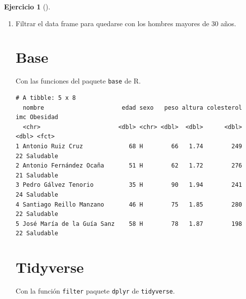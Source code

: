 \documentclass[
  a4paper,
]{scrreport}
\newenvironment{Shaded}{\begin{snugshade}}{\end{snugshade}}
\newcommand{\DecValTok}[1]{\textcolor[rgb]{0.68,0.00,0.00}{#1}}
\newcommand{\NormalTok}[1]{\textcolor[rgb]{0.00,0.23,0.31}{#1}}
\newcommand{\SpecialCharTok}[1]{\textcolor[rgb]{0.37,0.37,0.37}{#1}}
\newcommand{\StringTok}[1]{\textcolor[rgb]{0.13,0.47,0.30}{#1}}
\theoremstyle{definition}
\newtheorem{exercise}{Ejercicio}[chapter]
\theoremstyle{remark}
\begin{document}
\begin{exercise}[]
\begin{enumerate}
\begin{tcolorbox}
  \end{tcolorbox}
\item
  Filtrar el data frame para quedarse con los hombres mayores de 30
  años.

  \begin{tcolorbox}[enhanced jigsaw, breakable, toptitle=1mm, colbacktitle=quarto-callout-tip-color!10!white, rightrule=.15mm, opacityback=0, opacitybacktitle=0.6, titlerule=0mm, coltitle=black, colframe=quarto-callout-tip-color-frame, colback=white, bottomtitle=1mm, leftrule=.75mm, toprule=.15mm, title=\textcolor{quarto-callout-tip-color}{\faLightbulb}\hspace{0.5em}{Solución}, arc=.35mm, bottomrule=.15mm, left=2mm]

  \section{Base}

  Con las funciones del paquete \texttt{base} de R.

\begin{Shaded}
\end{Shaded}

\begin{verbatim}
# A tibble: 5 x 8
  nombre                      edad sexo   peso altura colesterol   imc Obesidad 
  <chr>                      <dbl> <chr> <dbl>  <dbl>      <dbl> <dbl> <fct>    
1 Antonio Ruiz Cruz             68 H        66   1.74        249    22 Saludable
2 Antonio Fernández Ocaña       51 H        62   1.72        276    21 Saludable
3 Pedro Gálvez Tenorio          35 H        90   1.94        241    24 Saludable
4 Santiago Reillo Manzano       46 H        75   1.85        280    22 Saludable
5 José María de la Guía Sanz    58 H        78   1.87        198    22 Saludable
\end{verbatim}

  \section{Tidyverse}

  Con la función \texttt{filter} paquete \texttt{dplyr} de
  \texttt{tidyverse}.


\end{tcolorbox}
\end{enumerate}
\end{exercise}
\end{document}
